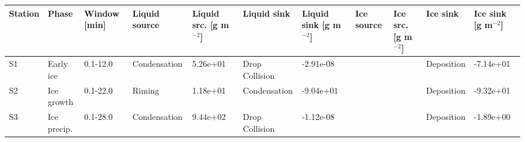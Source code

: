 \begin{tabular}{lllllllllll}
\toprule
Station & Phase & Window [min] & Liquid source & Liquid src. [g m$^{-2}$] & Liquid sink & Liquid sink [g m$^{-2}$] & Ice source & Ice src. [g m$^{-2}$] & Ice sink & Ice sink [g m$^{-2}$] \\
\midrule
S1 & Early ice & 0.1-12.0 & Condensation & 5.26e+01 & Drop Collision & -2.91e-08 &  &  & Deposition & -7.14e+01 \\
S2 & Ice growth & 0.1-22.0 & Riming & 1.18e+01 & Condensation & -9.04e+01 &  &  & Deposition & -9.32e+01 \\
S3 & Ice precip. & 0.1-28.0 & Condensation & 9.44e+02 & Drop Collision & -1.12e-08 &  &  & Deposition & -1.89e+00 \\
\bottomrule
\end{tabular}
